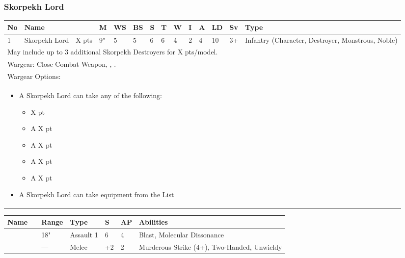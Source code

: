 \newpage
\subsubsection{Skorpekh Lord}

\noindent
\begin{tabular}{||m{10pt} m{95pt} m{30pt} m{11pt} m{11pt} m{11pt} m{11pt} m{11pt} m{11pt} m{11pt} m{11pt} m{11pt} m{11pt} m{125pt}||}
	\hline
	No & Name & & M & WS & BS & S & T & W & I & A & LD & Sv & Type \\
	\hline
	1 & Skorpekh Lord & X pts & 9" & 5 & 5 & 6 & 6 & 4 & 2 & 4 & 10 & 3+ & Infantry (Character, Destroyer, Monstrous, Noble) \\
	\hline
	\hline
	\multicolumn{14}{||Z{532 pt}||}{May include up to 3 additional Skorpekh Destroyers for X pts/model.}\\	
	\hline
	\hline
	\multicolumn{14}{||Z{532 pt}||}{Wargear: Close Combat Weapon, \quickref{Enmitic Annihilator}, \quickref{Hyperphase Harvester}.} \\
	\multicolumn{14}{||Z{532 pt}||}{Wargear Options:} \\	\multicolumn{14}{||Z{532 pt}||}{\begin{itemize}
			\item A Skorpekh Lord can take any of the following:
			\begin{itemize}
				\item \quickref{Mindshackle Scarabs} \hrulefill X pt
				\item A \quickref{Phase Shifter} \hrulefill X pt
				\item A \quickref{Phylactery} \hrulefill X pt
				\item A \quickref{Sempiternal Weave} \hrulefill X pt
				\item A \quickref{Shadow Ankh} \hrulefill X pt
			\end{itemize}
			\item A Skorpekh Lord can take equipment from the \quickref{Artefacts of the Aeons} List
	\end{itemize}} \\
	\hline
\end{tabular}

\noindent
\begin{tabular}{||m{110pt} m{30pt} m{31pt} m{55pt} m{12pt} m{12pt} m{210pt}||}
	\hline
	Name & & Range & Type & S & AP & Abilities \\
	\hline
	\quickref{Enmitic Annihilator} &  & 18" & Assault 1 & 6 & 4 & Blast, Molecular Dissonance \\
	\quickref{Hyperphase Harvester} &  & — & Melee & +2 & 2 & Murderous Strike (4+), Two-Handed, Unwieldy \\
	\hline
\end{tabular}

